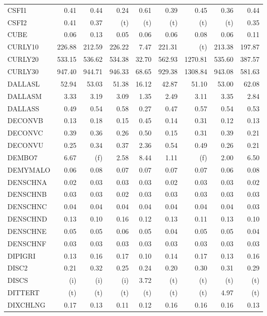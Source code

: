 \documentclass[11pt,twoside]{article}
\begin{document}
{\begin{longtable}[c]{|l|r|r|r|r|r|r|r|r|}
CSFI1 & 0.41 & 0.44 & 0.24 & 0.61 & 0.39 & 0.45 & 0.36 & 0.44 \\
CSFI2 & 0.41 & 0.37 & (t) & (t) & (t) & (t) & (t) & 0.35 \\
CUBE & 0.06 & 0.13 & 0.05 & 0.06 & 0.06 & 0.08 & 0.06 & 0.11 \\
CURLY10 & 226.88 & 212.59 & 226.22 & 7.47 & 221.31 & (t) & 213.38 & 197.87 \\
CURLY20 & 533.15 & 536.62 & 534.38 & 32.70 & 562.93 & 1270.81 & 535.60 & 387.57 \\
CURLY30 & 947.40 & 944.71 & 946.33 & 68.65 & 929.38 & 1308.84 & 943.08 & 581.63 \\
DALLASL & 52.94 & 53.03 & 51.38 & 16.12 & 42.87 & 51.10 & 53.00 & 62.08 \\
DALLASM & 3.33 & 3.19 & 3.09 & 1.35 & 2.49 & 3.11 & 3.35 & 2.84 \\
DALLASS & 0.49 & 0.54 & 0.58 & 0.27 & 0.47 & 0.57 & 0.54 & 0.53 \\
DECONVB & 0.13 & 0.18 & 0.15 & 0.45 & 0.14 & 0.31 & 0.12 & 0.13 \\
DECONVC & 0.39 & 0.36 & 0.26 & 0.50 & 0.15 & 0.31 & 0.39 & 0.21 \\
DECONVU & 0.25 & 0.34 & 0.37 & 2.36 & 0.54 & 0.49 & 0.26 & 0.21 \\
DEMBO7 & 6.67 & (f) & 2.58 & 8.44 & 1.11 & (f) & 2.00 & 6.50 \\
DEMYMALO & 0.06 & 0.08 & 0.07 & 0.07 & 0.07 & 0.07 & 0.06 & 0.08 \\
DENSCHNA & 0.02 & 0.03 & 0.03 & 0.03 & 0.02 & 0.03 & 0.03 & 0.02 \\
DENSCHNB & 0.03 & 0.03 & 0.02 & 0.03 & 0.03 & 0.03 & 0.03 & 0.03 \\
DENSCHNC & 0.04 & 0.04 & 0.04 & 0.04 & 0.04 & 0.04 & 0.04 & 0.03 \\
DENSCHND & 0.13 & 0.10 & 0.16 & 0.12 & 0.13 & 0.11 & 0.13 & 0.10 \\
DENSCHNE & 0.05 & 0.05 & 0.06 & 0.05 & 0.04 & 0.05 & 0.05 & 0.04 \\
DENSCHNF & 0.03 & 0.03 & 0.03 & 0.03 & 0.03 & 0.03 & 0.03 & 0.03 \\
DIPIGRI & 0.13 & 0.16 & 0.17 & 0.10 & 0.14 & 0.17 & 0.13 & 0.16 \\
DISC2 & 0.21 & 0.32 & 0.25 & 0.24 & 0.20 & 0.30 & 0.31 & 0.29 \\
DISCS & (i) & (i) & (i) & 3.72 & (t) & (t) & (t) & (t) \\
DITTERT & (t) & (t) & (t) & (t) & (t) & (t) & 4.97 & (t) \\
DIXCHLNG & 0.17 & 0.13 & 0.11 & 0.12 & 0.16 & 0.16 & 0.16 & 0.13 \\

\end{longtable}}
\end{document}
